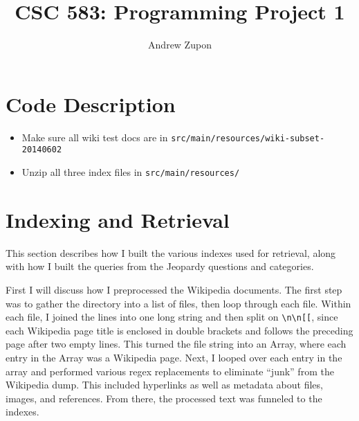 \documentclass[11pt,letterpaper]{article}
\title{CSC 583: Programming Project 1}
\author{Andrew Zupon \\
}
\date{}
\begin{document}
	\maketitle
	

\section{Code Description}

\begin{itemize}
	\item Make sure all wiki test docs are in \texttt{src/main/resources/wiki-subset- 20140602}
	
	\item Unzip all three index files in \texttt{src/main/resources/}
\end{itemize}
	
	
\section{Indexing and Retrieval}
This section describes how I built the various indexes used for retrieval, along with how I built the queries from the Jeopardy questions and categories.

First I will discuss how I preprocessed the Wikipedia documents.
The first step was to gather the directory into a list of files, then loop through each file.
Within each file, I joined the lines into one long string and then split on \texttt{\textbackslash{}n\textbackslash{}n[[}, since each Wikipedia page title is enclosed in double brackets and follows the preceding page after two empty lines.
This turned the file string into an Array, where each entry in the Array was a Wikipedia page.
Next, I looped over each entry in the array and performed various regex replacements to eliminate ``junk'' from the Wikipedia dump.
This included hyperlinks as well as metadata about files, images, and references.
From there, the processed text was funneled to the indexes.
\end{document}
